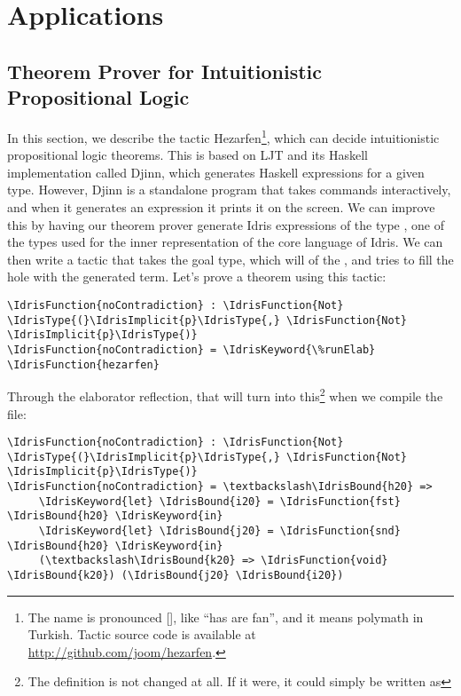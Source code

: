 \section{Applications} \label{sec:applications}

\subsection{Theorem Prover for Intuitionistic Propositional Logic}

In this section, we describe the tactic Hezarfen\footnote{ The name is
  pronounced {[]}, like ``has are fan'', and it means
    polymath in Turkish.  Tactic source code is available at
    \url{http://github.com/joom/hezarfen}.}, which can decide intuitionistic
propositional logic theorems. This is based on LJT\cite{ljt} and its Haskell
implementation called Djinn\cite{djinn}, which generates Haskell expressions
for a given type. However, Djinn is a standalone program that takes commands
interactively, and when it generates an expression it prints it on the screen.
We can improve this by having our
theorem prover generate Idris expressions of the type , one of the
types used for the inner representation of the core language of Idris.  We can
then write a tactic that takes the goal type, which will of the , and
tries to fill the hole with the generated term.  Let's prove a theorem using
this tactic:

\begin{Verbatim}
\IdrisFunction{noContradiction} : \IdrisFunction{Not} \IdrisType{(}\IdrisImplicit{p}\IdrisType{,} \IdrisFunction{Not} \IdrisImplicit{p}\IdrisType{)}
\IdrisFunction{noContradiction} = \IdrisKeyword{\%runElab} \IdrisFunction{hezarfen}
\end{Verbatim}

Through the elaborator reflection, that will turn into this\footnote{
  The definition is not changed at all. If it were, it could simply be written
  as

 } when we compile the file:
\begin{Verbatim}[commandchars=\\\{\}]
\IdrisFunction{noContradiction} : \IdrisFunction{Not} \IdrisType{(}\IdrisImplicit{p}\IdrisType{,} \IdrisFunction{Not} \IdrisImplicit{p}\IdrisType{)}
\IdrisFunction{noContradiction} = \textbackslash\IdrisBound{h20} =>
     \IdrisKeyword{let} \IdrisBound{i20} = \IdrisFunction{fst} \IdrisBound{h20} \IdrisKeyword{in}
     \IdrisKeyword{let} \IdrisBound{j20} = \IdrisFunction{snd} \IdrisBound{h20} \IdrisKeyword{in}
     (\textbackslash\IdrisBound{k20} => \IdrisFunction{void} \IdrisBound{k20}) (\IdrisBound{j20} \IdrisBound{i20})
\end{Verbatim}

